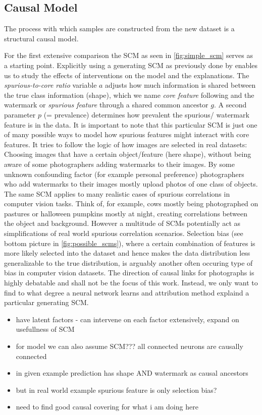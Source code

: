 \subsection{Causal Model}
The process with which samples are constructed from the new dataset is a structural causal model.

For the first extensive comparison the SCM as seen in \autoref{fig:simple_scm} serves as a starting point. Explicitly using a generating SCM as previously done by \cite{Parafita2019, Yang2019, Wilming2023} enables us to study the effects of interventions on the model and the explanations. The \textit{spurious-to-core ratio} variable $a$ adjusts how much information is shared between the true class information (shape), which we name \textit{core feature} following \cite{Singla2022} and the watermark or \textit{spurious feature} through a shared common ancestor $g$. A second parameter $p$ (= prevalence) determines how prevalent the spurious/ watermark feature is in the data. It is important to note that this particular SCM is just one of many possible ways to model how spurious features might interact with core features. It tries to follow the logic of how images are selected in real datasets: Choosing images that have a certain object/feature (here shape), without being aware of some photographers adding watermarks to their images. By some unknown confounding factor (for example personal preference) photographers who add watermarks to their images mostly upload photos of one class of objects.
The same SCM applies to many realistic cases of spurious correlations in computer vision tasks. Think of, for example, cows mostly being photographed on pastures or halloween pumpkins mostly at night, creating correlations between the object and background. However a multitude of SCMs potentially act as simplifications of real world spurious correlation scenarios. Selection bias (see bottom picture in \autoref{fig:possible_scms}), where a certain combination of features is more likely selected into the dataset and hence makes the data distribution less generalizable to the true distribution, is arguably another often occuring type of bias in computer vision datasets. The direction of causal links for photographs is highly debatable and shall not be the focus of this work. Instead, we only want to find to what degree a neural network learns and attribution method explaind a particular generating SCM.


{\color{red}
\begin{itemize}
    \item have latent factors - can intervene on each factor extensively, expand on usefullness of SCM
    \item for model we can also assume SCM??? all connected neurons are causally connected
    \item in given example prediction has shape AND watermark as causal ancestors
    \item but in real world example spurious feature is only selection bias?
    \item need to find good causal covering for what i am doing here
\end{itemize}}

